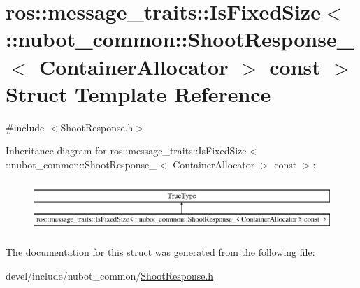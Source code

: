 \hypertarget{structros_1_1message__traits_1_1IsFixedSize_3_01_1_1nubot__common_1_1ShootResponse___3_01Containc3f9054942697facaa3ace56b16aa7dd}{\section{ros\-:\-:message\-\_\-traits\-:\-:Is\-Fixed\-Size$<$ \-:\-:nubot\-\_\-common\-:\-:Shoot\-Response\-\_\-$<$ Container\-Allocator $>$ const $>$ Struct Template Reference}
\label{structros_1_1message__traits_1_1IsFixedSize_3_01_1_1nubot__common_1_1ShootResponse___3_01Containc3f9054942697facaa3ace56b16aa7dd}
}


{\ttfamily \#include $<$Shoot\-Response.\-h$>$}

Inheritance diagram for ros\-:\-:message\-\_\-traits\-:\-:Is\-Fixed\-Size$<$ \-:\-:nubot\-\_\-common\-:\-:Shoot\-Response\-\_\-$<$ Container\-Allocator $>$ const $>$\-:\begin{figure}[H]
\begin{center}
\leavevmode
\includegraphics[height=1.927711cm]{structros_1_1message__traits_1_1IsFixedSize_3_01_1_1nubot__common_1_1ShootResponse___3_01Containc3f9054942697facaa3ace56b16aa7dd}
\end{center}
\end{figure}


The documentation for this struct was generated from the following file\-:\begin{DoxyCompactItemize}
\item 
devel/include/nubot\-\_\-common/\hyperlink{ShootResponse_8h}{Shoot\-Response.\-h}\end{DoxyCompactItemize}
